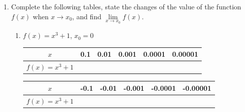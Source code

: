 \documentclass[12pt]{report}
\begin{document}
\begin{enumerate}
    \item Complete the following tables, state the changes of the value of the function
          $f (x)$ when $x \to x_0$, and find $\lim\limits_{x \to x_0} f (x)$.
          \begin{enumerate}
              \item $f (x) = x^3 + 1$, $x_0 = 0$
                    \begin{center}
                        \begin{tabular}{|c|c|c|c|c|c|}
                            \hline
                            $x$               & 0.1 & 0.01 & 0.001 & 0.0001 & 0.00001 \\
                            \hline
                            $f (x) = x^3 + 1$ &     &      &       &        &         \\
                            \hline
                        \end{tabular}
                        \vskip 0.2cm
                        \begin{tabular}{|c|c|c|c|c|c|}
                            \hline
                            $x$               & -0.1 & -0.01 & -0.001 & -0.0001 & -0.00001 \\
                            \hline
                            $f (x) = x^3 + 1$ &      &       &        &         &          \\
                            \hline
                        \end{tabular}
                    \end{center}
                    \sol{}
                    \begin{center}


\end{center}
\end{enumerate}
\end{enumerate}
\end{document}
